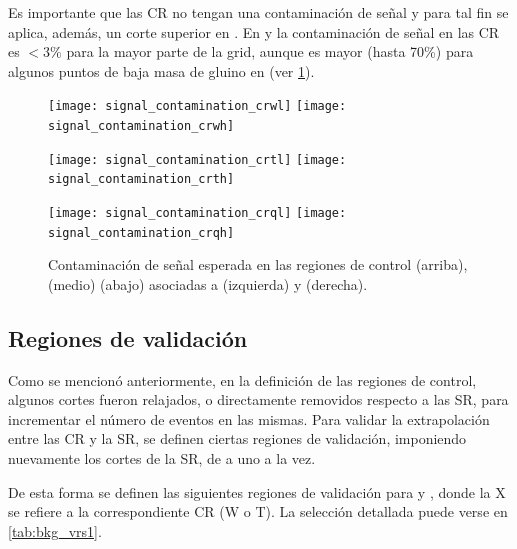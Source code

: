 
Es importante que las CR no tengan una contaminación de señal y para tal fin se aplica, además,
un corte superior en {\met}. En {\CRW} y
{\CRT} la contaminación de señal en las CR es $<3\%$ para la mayor parte de la
grid, aunque es mayor (hasta 70\%) para algunos puntos de baja masa de gluino en
{\CRTL} (ver \cref{fig:bkg_cr_contamination}).


\begin{figure}[!htbp]
  \centering

  \texttt{[image: signal\_contamination\_crwl]}
  \texttt{[image: signal\_contamination\_crwh]}

  \texttt{[image: signal\_contamination\_crtl]}
  \texttt{[image: signal\_contamination\_crth]}

  \texttt{[image: signal\_contamination\_crql]}
  \texttt{[image: signal\_contamination\_crqh]}


  \caption{Contaminación de señal esperada en las regiones de control {\CRQ} (arriba), {\CRW} (medio) {\CRT} (abajo) asociadas a {\SRL} (izquierda) y {\SRH} (derecha).}
  \label{fig:bkg_cr_contamination}
\end{figure}



\subsection{Regiones de validación}

Como se mencionó anteriormente, en la definición de las regiones de control,
algunos cortes fueron relajados, o directamente removidos respecto a las SR,
para incrementar el número de eventos en las mismas. Para validar la
extrapolación entre las CR y la SR, se definen ciertas regiones de validación,
imponiendo nuevamente los cortes de la SR, de a uno a la vez.

De esta forma se definen las siguientes regiones de validación para {\CRW} y
{\CRT}, donde la X se refiere a la correspondiente CR (W o T). La selección
detallada puede verse en \cref{tab:bkg_vrs1}.

